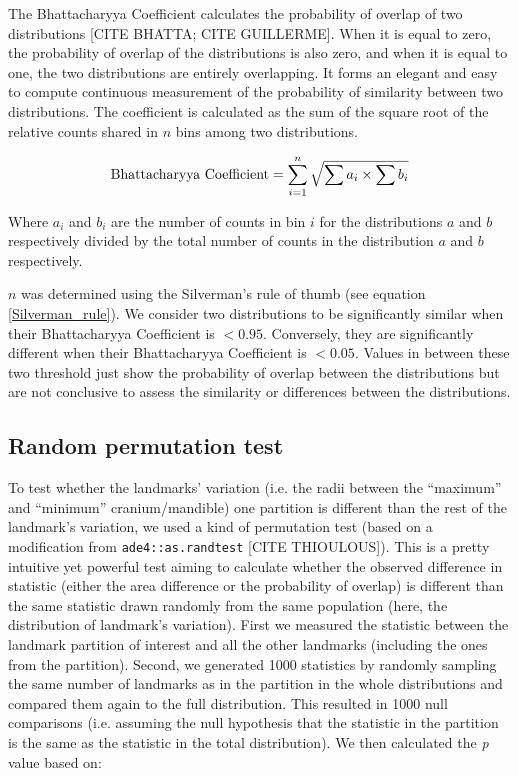 \documentclass[a4paper,11pt]{article}
\begin{document}
The Bhattacharyya Coefficient calculates the probability of overlap of two distributions [CITE BHATTA; CITE GUILLERME].
When it is equal to zero, the probability of overlap of the distributions is also zero, and when it is equal to one, the two distributions are entirely overlapping.
It forms an elegant and easy to compute continuous measurement of the probability of similarity between two distributions.
The coefficient is calculated as the sum of the square root of the relative counts shared in $n$ bins among two distributions.

\begin{equation}
    \textnormal{Bhattacharyya Coefficient}=\sum_{i=1}^{n} \sqrt{{\sum{a_i}}\times{\sum{b_i}}}
\end{equation}

\noindent Where ${a_i}$ and ${b_i}$  are the number of counts in bin $i$ for the distributions $a$ and $b$ respectively divided by the total number of counts in the distribution $a$ and $b$ respectively.

$n$ was determined using the Silverman's rule of thumb (see equation \ref{Silverman_rule}).
We consider two distributions to be significantly similar when their Bhattacharyya Coefficient is $< 0.95$.
Conversely, they are significantly different when their Bhattacharyya Coefficient is $< 0.05$.
Values in between these two threshold just show the probability of overlap between the distributions but are not conclusive to assess the similarity or differences between the distributions.

\subsection{Random permutation test}

To test whether the landmarks' variation (i.e. the radii between the ``maximum'' and ``minimum'' cranium/mandible) one partition is different than the rest of the landmark's variation, we used a kind of permutation test (based on a modification from \texttt{ade4::as.randtest} [CITE THIOULOUS]).
This is a pretty intuitive yet powerful test aiming to calculate whether the observed difference in statistic (either the area difference or the probability of overlap) is different than the same statistic drawn randomly from the same population (here, the distribution of landmark's variation).
First we measured the statistic between the landmark partition of interest and all the other landmarks (including the ones from the partition).
Second, we generated 1000 statistics by randomly sampling the same number of landmarks as in the partition in the whole distributions and compared them again to the full distribution.
This resulted in 1000 null comparisons (i.e. assuming the null hypothesis that the statistic in the partition is the same as the statistic in the total distribution).
We then calculated the \textit{p} value based on:
\end{document}
